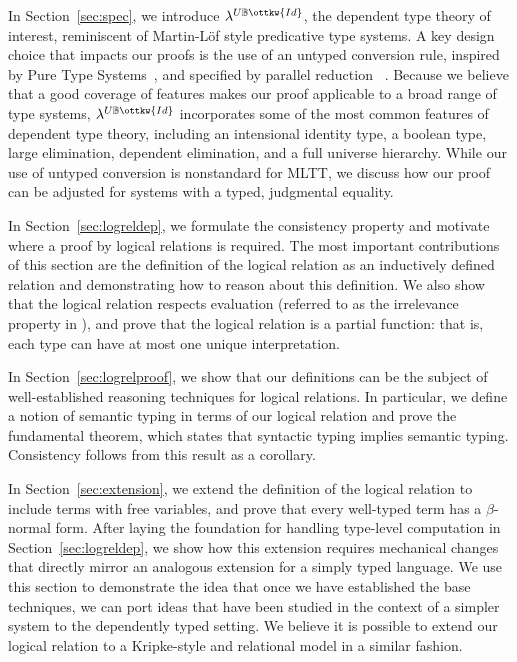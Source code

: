 \documentclass[acmsmall,screen=true,
\ifpublic review=false\else,review=true\fi
  ,anonymous=\ifanonymous true\else false\fi]{acmart}
\newcommand{\lang}{$\lambda^{U\mathbb{B}\ottkw{Id}}$\xspace}
\begin{document}
In Section~\ref{sec:spec}, we introduce \lang{}, the dependent type theory of
interest, reminiscent of Martin-Löf style predicative type systems. A key
design choice that impacts our proofs is the use of an untyped conversion
rule, inspired by Pure Type Systems~\citep{barendregt1991introduction}, and
specified by parallel
reduction~\citep{takahashi-parallel-reduction, barendregt:lambda-calculi-with-types} %
.
Because we believe that a good coverage of features makes our proof applicable
to a broad range of type systems, \lang{} incorporates some of the most common
features of dependent type theory, including an intensional identity type, a
boolean type, large elimination, dependent elimination, and a full universe
hierarchy. While our use of untyped conversion is nonstandard for MLTT, we
discuss how our proof can be adjusted for systems with a typed, judgmental
equality.

In Section~\ref{sec:logreldep}, we formulate the consistency property and
motivate where a proof by logical relations is required. The most important
contributions of this section are the definition of the logical relation as an
inductively defined relation and demonstrating how to reason about this
definition. We also show that the logical relation respects evaluation
(referred to as the irrelevance property in \citet{martin-lof-a-la-coq}), and
prove that the logical relation is a partial function: that is, each type can
have at most one unique interpretation.

In Section~\ref{sec:logrelproof}, we show that our definitions can be the
subject of well-established reasoning techniques for logical relations. In
particular, we define a notion of semantic typing in terms of our logical
relation and prove the fundamental theorem, which states that syntactic typing
implies semantic typing. Consistency follows from this result as a corollary.

In Section~\ref{sec:extension}, we extend the definition of the logical relation
to include terms with free variables, and prove that every well-typed term
has a $\beta$-normal form. After laying the foundation for handling type-level
computation in Section~\ref{sec:logreldep}, we show how this extension requires mechanical
changes that directly mirror an analogous extension for a simply typed
language. We use this section to demonstrate the idea that once we have
established the base techniques, we can port ideas that have been studied in
the context of a simpler system to the dependently typed setting.  We believe
it is possible to extend our logical relation to a Kripke-style and relational
model in a similar fashion.
\end{document}
